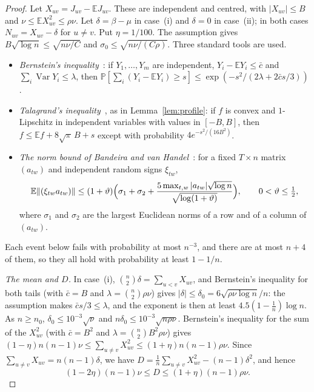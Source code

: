 \documentclass[11pt,a4paper]{article}
\theoremstyle{definition}
\theoremstyle{remark}
\newcommand{\E}{\mathbb E}
\newcommand{\Prb}{\mathbb P}
\begin{document}
\begin{proof}
Let $X_{uv}=J_{uv}-\E J_{uv}$. These are independent and centred, with
$|X_{uv}|\le B$ and $\nu\le\E X_{uv}^2\le\rho\nu$. Let $\delta=\beta-\mu$ in
case~(i) and $\delta=0$ in case~(ii); in both cases $N_{uv}=X_{uv}-\delta$ for
$u\ne v$. Put $\eta=1/100$. The assumption gives $B\sqrt{\log n}\le\sqrt{n\nu/C}$
and $\sigma_0\le\sqrt{n\nu/(C\rho)}$. Three standard tools are used.
\begin{itemize}
 \item \emph{Bernstein's inequality}~\cite{BLM13}: if $Y_1,\dots,Y_m$ are
 independent, $Y_i-\E Y_i\le\bar c$ and $\sum_i\operatorname{Var}Y_i\le\lambda$,
 then $\Prb[\sum_i(Y_i-\E Y_i)\ge s]\le\exp(-s^2/(2\lambda+2\bar cs/3))$.
 \item \emph{Talagrand's inequality}~\cite{Tal95}, as in
 Lemma~\ref{lem:profile}: if $f$ is convex and $1$-Lipschitz in independent
 variables with values in $[-B,B]$, then $f\le\E f+8\sqrt\pi\,B+s$ except with
 probability $4e^{-s^2/(16B^2)}$.
 \item \emph{The norm bound of Bandeira and van
 Handel}~\cite[Theorem~3.1 and Corollary~3.2]{BvH16}: for a fixed $T\times n$
 matrix $(a_{tw})$ and independent random signs $\xi_{tw}$,
 \[
  \E\|(\xi_{tw}a_{tw})\|\le(1+\vartheta)\Bigl(\sigma_1+\sigma_2
  +\frac{5\max_{t,w}|a_{tw}|\sqrt{\log n}}{\sqrt{\log(1+\vartheta)}}\Bigr),
  \qquad0<\vartheta\le\tfrac12,
 \]
 where $\sigma_1$ and $\sigma_2$ are the largest Euclidean norms of a row and
 of a column of $(a_{tw})$.
\end{itemize}
Each event below fails with probability at most $n^{-3}$, and there are at most
$n+4$ of them, so they all hold with probability at least $1-1/n$.

\emph{The mean and $D$.} In case~(i), $\binom n2\delta=\sum_{u<v}X_{uv}$, and
Bernstein's inequality for both tails (with $\bar c=B$ and
$\lambda=\binom n2\rho\nu$) gives $|\delta|\le\delta_0=6\sqrt{\rho\nu\log n}/n$:
the assumption makes $\bar cs/3\le\lambda$, and the exponent is then at least
$4.5(1-\frac1n)\log n$. As $n\ge n_0$, $\delta_0\le10^{-3}\sqrt\nu$ and
$n\delta_0\le10^{-3}\sqrt{n\rho\nu}$. Bernstein's inequality for the sum of the
$X_{uv}^2$ (with $\bar c=B^2$ and $\lambda=\binom n2B^2\rho\nu$) gives
$(1-\eta)n(n-1)\nu\le\sum_{u\ne v}X_{uv}^2\le(1+\eta)n(n-1)\rho\nu$. Since
$\sum_{u\ne v}X_{uv}=n(n-1)\delta$, we have
$D=\frac1n\sum_{u\ne v}X_{uv}^2-(n-1)\delta^2$, and hence
\begin{equation}\label{eq:Dbounds}
 (1-2\eta)(n-1)\nu\le D\le(1+\eta)(n-1)\rho\nu .
\end{equation}


\end{proof}
\end{document}
